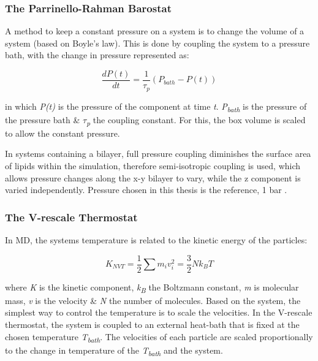 \subsubsection{The Parrinello-Rahman Barostat}

A method to keep a constant pressure on a system is to change the volume of a system (based on Boyle's law). This is done by coupling the system to a pressure bath, with the change in pressure represented as:


\begin{equation}
\frac{dP(t)}{dt} = \frac{1}{\tau_{p}}(P_{bath} - P (t))
\label{eq:berdendsen3}
\end{equation}

in which \textit{P(t)} is the pressure of the component at time \textit{t}. \textit{P\textsubscript{bath}} is the pressure of the pressure bath \& \textit{$\tau$\textsubscript{p}} the coupling constant. For this, the box volume is scaled to allow the constant pressure. 

In systems containing a bilayer, full pressure coupling diminishes the surface area of lipids within the simulation, therefore semi-isotropic coupling is used, which allows pressure changes along the x-y bilayer to vary, while the z component is varied independently. Pressure chosen in this thesis is the reference, 1 bar \cite{Tieleman2010}.


\subsubsection{The V-rescale Thermostat}

In MD, the systems temperature is related to the kinetic energy of the particles:

\begin{equation}
K_{NVT} = \frac{1}{2}\sum m_{i} v^{2}_{i} = \frac{3}{2}Nk_{B}T
\label{eq:berendsen1}
\end{equation}

where \textit{K} is the kinetic component, \textit{k\textsubscript{B}} the Boltzmann constant, \textit{m} is molecular mass, \textit{v} is the velocity \& \textit{N} the number of molecules. Based on the system, the simplest way to control the temperature is to scale the velocities. In the V-rescale thermostat, the system is coupled to an external heat-bath that is fixed at the chosen temperature \textit{T\textsubscript{bath}}. The velocities of each particle are scaled proportionally to the change in temperature of the \textit{T\textsubscript{bath}} and the system.

